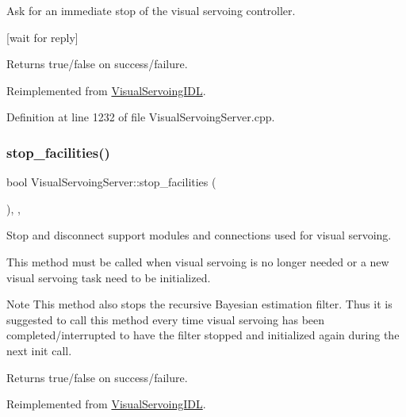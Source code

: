 Ask for an immediate stop of the visual servoing controller. 

\mbox{[}wait for reply\mbox{]} \begin{DoxyReturn}{Returns}
true/false on success/failure. 
\end{DoxyReturn}


Reimplemented from \hyperlink{classVisualServoingIDL_ac8909c1f4d5eb4cd1ab010fb3dcd7efb}{Visual\+Servoing\+I\+DL}.



Definition at line 1232 of file Visual\+Servoing\+Server.\+cpp.

\mbox{\label{classVisualServoingServer_ae5e4ac8d334374f2de259a530781443b}} 
\subsubsection{\texorpdfstring{stop\+\_\+facilities()}{stop\_facilities()}}
{\footnotesize\ttfamily bool Visual\+Servoing\+Server\+::stop\+\_\+facilities (\begin{DoxyParamCaption}{ }\end{DoxyParamCaption})\hspace{0.3cm}{\ttfamily [override]}, {\ttfamily [protected]}, {\ttfamily [virtual]}}



Stop and disconnect support modules and connections used for visual servoing. 

This method must be called when visual servoing is no longer needed or a new visual servoing task need to be initialized. \begin{DoxyNote}{Note}
This method also stops the recursive Bayesian estimation filter. Thus it is suggested to call this method every time visual servoing has been completed/interrupted to have the filter stopped and initialized again during the next init call. 
\end{DoxyNote}
\begin{DoxyReturn}{Returns}
true/false on success/failure. 
\end{DoxyReturn}


Reimplemented from \hyperlink{classVisualServoingIDL_a777cc1a83b3c0ae3dd86e36a0298970e}{Visual\+Servoing\+I\+DL}.



